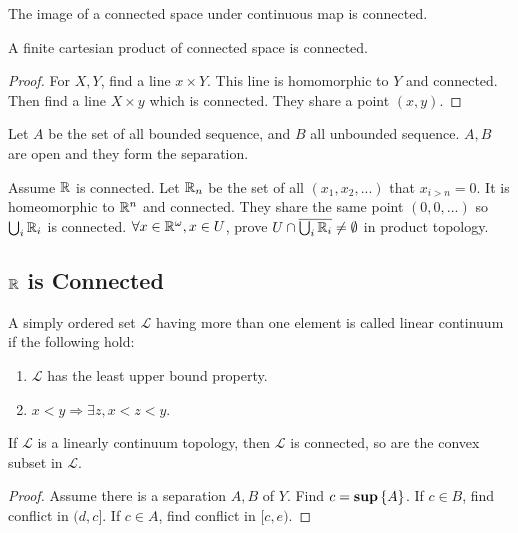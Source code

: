 \begin{theorem}
The image of a connected space under continuous map is connected.    
\end{theorem}

\begin{theorem}
A finite cartesian product of connected space is connected.
\end{theorem}
\begin{proof}
For $X,Y$, find a line $x \times Y$. This line is homomorphic to $Y$ and connected. Then find a line $X \times y$ which is connected. They share a point $(x,y)$.
\end{proof}

\begin{example}
    Let $A$ be the set of all bounded sequence, and $B$ all unbounded sequence. $A,B$ are open and they form the separation.
\end{example}

\begin{example}
    Assume $\mathbb{R}$ is connected. Let $\mathbb{R}_n$ be the set of all $(x_1, x_2, ...)$ that $x_{i > n} = 0$. It is homeomorphic to $\mathbb{R}^n$ and connected. They share the same point $(0,0,...)$ so $\bigcup_i \mathbb{R}_i$ is connected. $\forall x \in \mathbb{R}^\omega, x \in U$, prove $U \cap \overline{\bigcup_i \mathbb{R}_i} \neq \emptyset$ in product topology.
\end{example}


\subsection{$\mathbb{R}$ is Connected}

\begin{definition}
    A simply ordered set $\mathcal{L}$ having more than one element is called linear continuum if the following hold:
    \begin{enumerate}
        \item $\mathcal{L}$ has the least upper bound property.
        \item $x < y \Rightarrow \exists z, x < z < y$.
    \end{enumerate}
\end{definition}

\begin{theorem}
    If $\mathcal{L}$ is a linearly continuum topology, then $\mathcal{L}$ is connected, so are the convex subset in $\mathcal{L}$.
\end{theorem}
\begin{proof}
    Assume there is a separation $A,B$ of $Y$. Find $c = \mathbf{sup} \set{A}$. If $c \in B$, find conflict in $(d, c]$. If $c \in A$, find conflict in $[c, e)$.
\end{proof}

